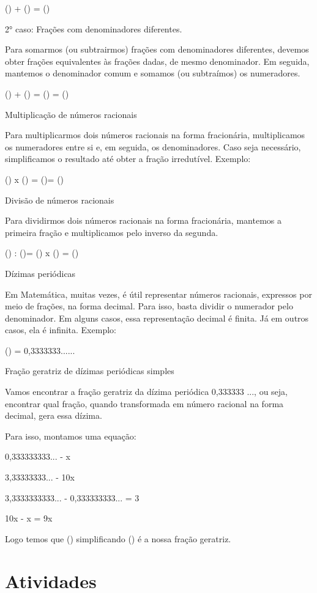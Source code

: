 () + () = ()

2° caso: Frações com denominadores diferentes.

Para somarmos (ou subtrairmos) frações com denominadores diferentes,
devemos obter frações equivalentes às frações dadas, de mesmo
denominador. Em seguida, mantemos o denominador comum e somamos (ou
subtraímos) os numeradores.

() + () = () =
()

Multiplicação de números racionais

Para multiplicarmos dois números racionais na forma fracionária,
multiplicamos os numeradores entre si e, em seguida, os denominadores.
Caso seja necessário, simplificamos o resultado até obter a fração
irredutível. Exemplo:

() x () = ()= ()

Divisão de números racionais

Para dividirmos dois números racionais na forma fracionária, mantemos a
primeira fração e multiplicamos pelo inverso da segunda.

() : ()= () x () =
()

Dízimas periódicas

Em Matemática, muitas vezes, é útil representar números racionais,
expressos por meio de frações, na forma decimal. Para isso, basta
dividir o numerador pelo denominador. Em alguns casos, essa
representação decimal é finita. Já em outros casos, ela é infinita.
Exemplo:

() = 0,3333333......

Fração geratriz de dízimas periódicas simples

Vamos encontrar a fração geratriz da dízima periódica 0,333333 ..., ou
seja, encontrar qual fração, quando transformada em número racional na
forma decimal, gera essa dízima.

Para isso, montamos uma equação:

0,333333333... - x

3,33333333... - 10x

3,3333333333... - 0,333333333... = 3

10x - x = 9x

Logo temos que () simplificando () é a nossa
fração geratriz.

\section{Atividades}

